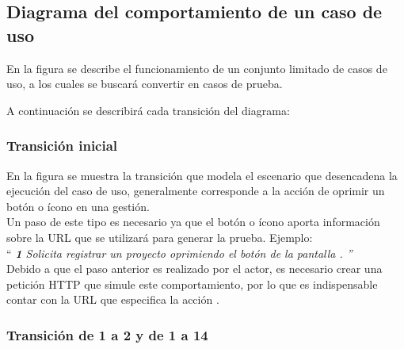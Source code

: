 \subsection{Diagrama del comportamiento de un caso de uso}
En la figura  se describe el funcionamiento de un conjunto limitado de casos de uso, a los cuales se buscará convertir en casos de prueba.


A continuación se describirá cada transición del diagrama:\\

\subsubsection{Transición inicial}  
En la figura  se muestra la transición que modela el escenario que desencadena la ejecución del caso de uso, generalmente corresponde a la acción de oprimir un botón o ícono en una gestión. \\
Un paso de este tipo es necesario ya que el botón o ícono aporta información sobre la URL que se utilizará para generar la prueba. Ejemplo:\\

{``\it
    {\bf 1} \UCactor Solicita registrar un proyecto oprimiendo el botón  de la pantalla .
''}\\
	
	Debido a que el paso anterior es realizado por el actor, es necesario crear una petición HTTP que simule este comportamiento, por lo que es indispensable contar con la URL que especifica la acción .\\
		
	
\subsubsection{Transición de 1 a 2 y de 1 a 14}
   
